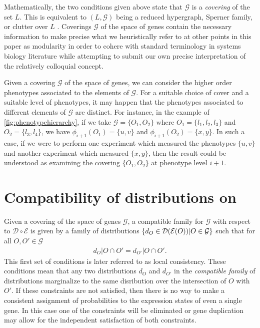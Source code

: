 Mathematically, the two conditions given above state that $\mathcal{G}$ is a \emph{covering} of the set $L$.  This is equivalent to $(L, \mathcal{G})$ being a reduced hypergraph, Sperner family, or clutter over $L$ \cite{Lauritzen1996}.  Coverings $\mathcal{G}$ of the space of genes contain the necessary information to make precise what we heuristically refer to at other points in this paper as modularity in order to cohere with standard terminology in systems biology literature while attempting to submit our own precise interpretation of the relatively colloquial concept.

Given a covering $\mathcal{G}$ of the space of genes, we can consider the higher order phenotypes associated to the elements of $\mathcal{G}$.  For a suitable choice of cover and a suitable level of phenotypes, it may happen that the phenotypes associated to different elements of $\mathcal{G}$ are distinct.  For instance, in the example of \ref{fig:phenotypehierarchy}, if we take $\mathcal{G} = \{O_1, O_2\}$ where $O_1 = \{l_1, l_2, l_3\}$ and $O_2 = \{l_3, l_4\}$, we have $\phi_{i+1}(O_1) = \{u,v\}$ and $\phi_{i+1}(O_2) = \{x,y\}$.  In such a case, if we were to perform one experiment which measured the phenotypes $\{u,v\}$ and another experiment which measured $\{x,y\}$, then the result could be understood as examining the covering $\{O_1, O_2\}$ at phenotype level $i+1$.

\section{Compatibility of distributions on \gnpm{}}\label{sec:compatibilityofgpms}
Given a covering of the space of genes $\mathcal{G}$, a compatible family for $\mathcal{G}$ with respect to $\mathcal{D} \circ \mathcal{E}$ is given by a family of distributions $\{d_O \in \mathcal{D} (\mathcal{E}(O)) | O \in \mathcal{G}\}$ such that for all $O, O' \in \mathcal{G}$
\begin{eqnarray}\label{eq:sheafcond}
d_O|O \cap O' = d_{O'}|O \cap O'.
\end{eqnarray}
This first set of conditions is later referred to as local consistency. These conditions mean that any two distributions $d_O$ and $d_{O'}$ in the \emph{compatible family} of distributions marginalize to the same disribution over the intersection of $O$ with $O'$. If these constraints are not satisfied, then there is no way to make a consistent assignment of probabilities to the expression states of even a single gene. In this case one of the constraints will be eliminated or gene duplication may allow for the independent satisfaction of both constraints.

